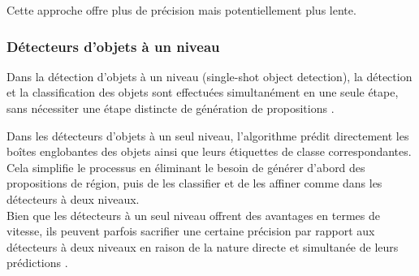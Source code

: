 Cette approche offre plus de précision mais potentiellement plus lente.

\subsubsection{Détecteurs d'objets à un niveau}  
Dans la détection d'objets à un niveau (single-shot object detection), la détection et la classification des objets sont effectuées simultanément en une seule étape, sans nécessiter une étape distincte de génération de propositions \cite{ch2_The5Comp69}.

Dans les détecteurs d'objets à un seul niveau, l'algorithme prédit directement les boîtes englobantes des objets ainsi que leurs étiquettes de classe correspondantes. Cela simplifie le processus en éliminant le besoin de générer d'abord des propositions de région, puis de les classifier et de les affiner comme dans les détecteurs à deux niveaux. \\
Bien que les détecteurs à un seul niveau offrent des avantages en termes de vitesse, ils peuvent parfois sacrifier une certaine précision par rapport aux détecteurs à deux niveaux en raison de la nature directe et simultanée de leurs prédictions \cite{ch2_The5Comp69}.\\

